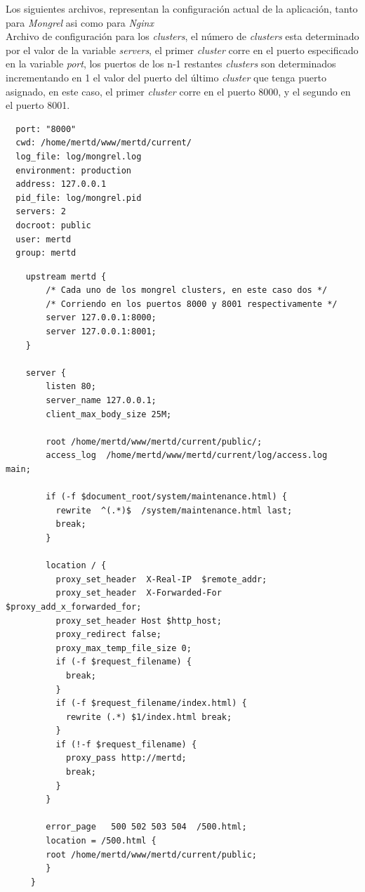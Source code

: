 Los siguientes archivos, representan la configuración actual de la aplicación, tanto para \emph{Mongrel} asi como para \emph{Nginx}\\

Archivo de configuración para los \emph{clusters}, el número de \emph{clusters} esta determinado por el valor de la variable \emph{servers}, el primer \emph{cluster} corre en el puerto especificado en la variable \emph{port}, los puertos de los n-1 restantes \emph{clusters} son determinados incrementando en 1 el valor del puerto del último \emph{cluster} que tenga puerto asignado, en este caso, el primer \emph{cluster} corre en el puerto 8000, y el segundo en el puerto 8001.

\begin{verbatim}
  port: "8000" 
  cwd: /home/mertd/www/mertd/current/
  log_file: log/mongrel.log 
  environment: production 
  address: 127.0.0.1 
  pid_file: log/mongrel.pid 
  servers: 2
  docroot: public 
  user: mertd
  group: mertd 
\end{verbatim}

\begin{verbatim}
	upstream mertd {
		/* Cada uno de los mongrel clusters, en este caso dos */
		/* Corriendo en los puertos 8000 y 8001 respectivamente */
		server 127.0.0.1:8000; 
		server 127.0.0.1:8001;
	}

	server {
	    listen 80;
	    server_name 127.0.0.1;
	    client_max_body_size 25M;

	    root /home/mertd/www/mertd/current/public/;
	    access_log  /home/mertd/www/mertd/current/log/access.log  main;

	    if (-f $document_root/system/maintenance.html) {
	      rewrite  ^(.*)$  /system/maintenance.html last;
	      break;
	    }

	    location / {
	      proxy_set_header  X-Real-IP  $remote_addr;
	      proxy_set_header  X-Forwarded-For $proxy_add_x_forwarded_for;
	      proxy_set_header Host $http_host;
	      proxy_redirect false;
	      proxy_max_temp_file_size 0;
	      if (-f $request_filename) {
	        break;
	      }
	      if (-f $request_filename/index.html) {
	        rewrite (.*) $1/index.html break;
	      }
	      if (!-f $request_filename) {
	        proxy_pass http://mertd;
	        break;
	      }
	    }

	    error_page   500 502 503 504  /500.html;
	    location = /500.html {
	    root /home/mertd/www/mertd/current/public;
	    }
	 }
\end{verbatim}

